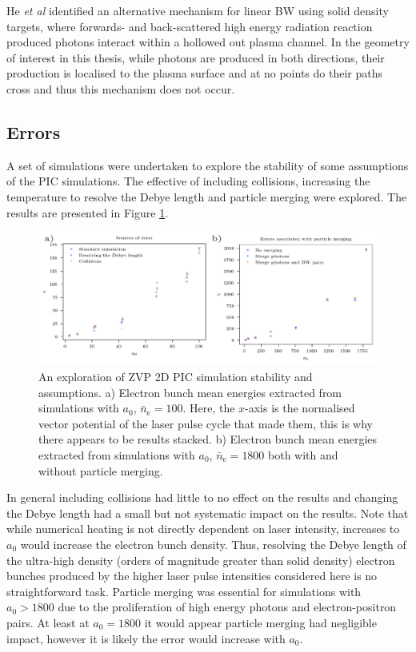 He \textit{et al} \cite{heSinglelaserSchemeObservation2021} identified an alternative mechanism for linear \ac{BW} using solid density targets, where forwards- and back-scattered high energy radiation reaction produced photons interact within a hollowed out plasma channel. In the geometry of interest in this thesis, while photons are produced in both directions, their production is localised to the plasma surface and at no points do their paths cross and thus this mechanism does not occur.



\subsection{Errors}
A set of simulations were undertaken to explore the stability of some assumptions of the PIC simulations. The effective of including collisions, increasing the temperature to resolve the Debye length and particle merging were explored. The results are presented in Figure \ref{fig:zvperrorsources}. 
\begin{figure}
	\centering
	\includegraphics[width=1\linewidth]{figures/zvp/zvp_error_sources}
	\caption[An exploration of ZVP 2D PIC simulation stability.]{An exploration of ZVP 2D PIC simulation stability and assumptions. a) Electron bunch mean energies extracted from simulations with $a_0$, $\bar{n}_\mathrm{e} =100$. Here, the $x$-axis is the normalised vector potential of the laser pulse cycle that made them, this is why there appears to be results stacked. b) Electron bunch mean energies extracted from simulations with $a_0$, $\bar{n}_\mathrm{e} =1800$ both with and without particle merging.}
	\label{fig:zvperrorsources}
\end{figure}
In general including collisions had little to no effect on the results and changing the Debye length had a small but not systematic impact on the results. Note that while numerical heating is not directly dependent on laser intensity, increases to $a_0$ would increase the electron bunch density. Thus, resolving the Debye length of the ultra-high density (orders of magnitude greater than solid density) electron bunches produced by the higher laser pulse intensities considered here is no straightforward task. Particle merging was essential for simulations with $a_0 > 1800$ due to the proliferation of high energy photons and electron-positron pairs. At least at $a_0 = 1800$ it would appear particle merging had negligible impact, however it is likely the error would increase with $a_0$.

